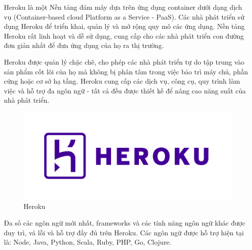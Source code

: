 Heroku là một Nền tảng đám mây dựa trên ứng dụng container dưới dạng dịch vụ (Container-based cloud Platform as a Service - PaaS). Các nhà phát triển sử dụng Heroku để triển khai, quản lý và mở rộng quy mô các ứng dụng. Nền tảng Heroku rất linh hoạt và dễ sử dụng, cung cấp cho các nhà phát triển con đường đơn giản nhất để đưa ứng dụng của họ ra thị trường.\par

Heroku được quản lý chặc chẽ, cho phép các nhà phát triển tự do tập trung vào sản phẩm cốt lõi của họ mà không bị phân tâm trong việc bảo trì máy chủ, phần cứng hoặc cơ sở hạ tầng. Heroku cung cấp các dịch vụ, công cụ, quy trình làm việc và hỗ trợ đa ngôn ngữ - tất cả đều được thiết kế để nâng cao năng suất của nhà phát triển.\par

\begin{figure}[H]
    \begin{center}
        \includegraphics[width=12cm]{Image/Technical/heroku.png}
        \caption{Heroku}
        \label{heroku}
    \end{center}
\end{figure}

Đa số các ngôn ngữ mới nhất, frameworks và các tính năng ngôn ngữ khác được duy trì, vá lỗi và hỗ trợ đầy đủ trên Heroku. Các ngôn ngữ được hỗ trợ hiện tại là: Node, Java, Python, Scala, Ruby, PHP, Go, Clojure.\par

